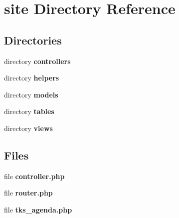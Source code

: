 \section{site Directory Reference}
\label{dir_08b1720442ac49d961662e2230cf125b}
\subsection*{Directories}
\begin{DoxyCompactItemize}
\item 
directory \textbf{ controllers}
\item 
directory \textbf{ helpers}
\item 
directory \textbf{ models}
\item 
directory \textbf{ tables}
\item 
directory \textbf{ views}
\end{DoxyCompactItemize}
\subsection*{Files}
\begin{DoxyCompactItemize}
\item 
file \textbf{ controller.\+php}
\item 
file \textbf{ router.\+php}
\item 
file \textbf{ tks\+\_\+agenda.\+php}
\end{DoxyCompactItemize}

